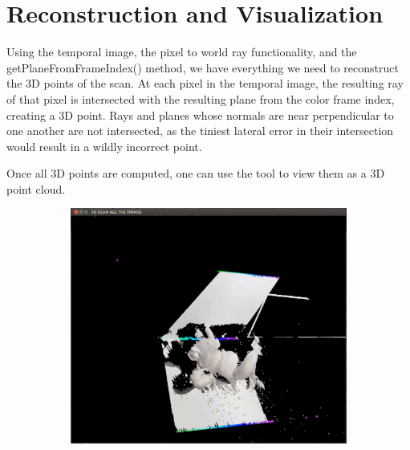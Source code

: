 \documentclass[10pt]{article}
\begin{document}
\section{Reconstruction and Visualization}
Using the temporal image, the pixel to world ray functionality, and the getPlaneFromFrameIndex() method, we have everything we need to reconstruct the 3D points of the scan. At each pixel in the temporal image, the resulting ray of that pixel is intersected with the resulting plane from the color frame index, creating a 3D point. Rays and planes whose normals are near perpendicular to one another are not intersected, as the tiniest lateral error in their intersection would result in a wildly incorrect point.

Once all 3D points are computed, one can use the tool to view them as a 3D point cloud.
\begin{figure}[h!]
  \centering

    \begin{subfigure}[b]{0.32\linewidth}
           \centering
            \includegraphics[width=\linewidth]{frog/frog}
            \caption{}
           

\end{subfigure}
\end{figure}
\end{document}
